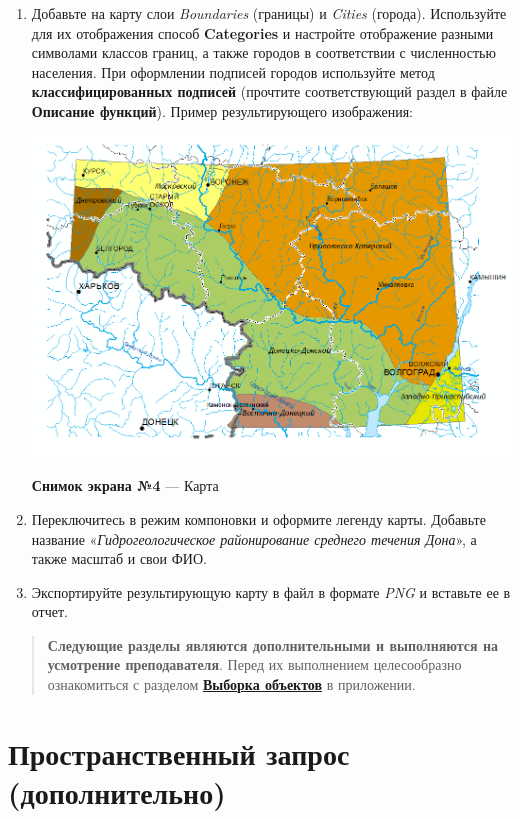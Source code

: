 \documentclass[]{book}
\theoremstyle{definition}
\theoremstyle{definition}
\theoremstyle{definition}
\theoremstyle{remark}
\begin{document}
\begin{enumerate}
\def\labelenumi{\arabic{enumi}.}
\item
  Добавьте на карту слои \emph{Boundaries} (границы) и \emph{Cities}
  (города). Используйте для их отображения способ \textbf{Categories} и
  настройте отображение разными символами классов границ, а также
  городов в соответствии с численностью населения. При оформлении
  подписей городов используйте метод \textbf{классифицированных
  подписей} (прочтите соответствующий раздел в файле \textbf{Описание
  функций}). Пример результирующего изображения:

  \includegraphics{images/Ex06/image24.png}

  \textbf{Снимок экрана №4} --- Карта
\item
  Переключитесь в режим компоновки и оформите легенду карты. Добавьте
  название «\emph{Гидрогеологическое районирование среднего течения
  Дона}», а также масштаб и свои ФИО.
\item
  Экспортируйте результирующую карту в файл в формате \emph{PNG} и
  вставьте ее в отчет.
\end{enumerate}

\begin{quote}
\textbf{Следующие разделы являются дополнительными и выполняются на
усмотрение преподавателя}. Перед их выполнением целесообразно
ознакомиться с разделом
\textbf{\protect\hyperlink{manual-select}{Выборка объектов}} в
приложении.
\end{quote}

\hypertarget{map-ref-hydrogeologic-query}{%
\section{Пространственный запрос
(дополнительно)}\label{map-ref-hydrogeologic-query}}
\end{document}
